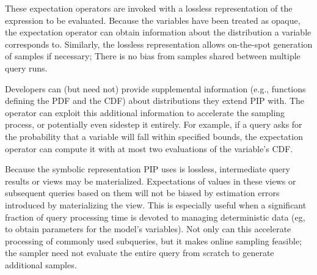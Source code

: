 These expectation operators are invoked with a lossless representation of the expression to be evaluated.  Because the variables have been treated as opaque, the expectation operator can obtain information about the distribution a variable corresponds to.  Similarly, the lossless representation allows on-the-spot generation of samples if necessary; There is no bias from samples shared between multiple query runs.

Developers can (but need not) provide supplemental information (e.g., functions defining the PDF and the CDF) about distributions they extend PIP with.  The operator can exploit this additional information to accelerate the sampling process, or potentially even sidestep it entirely.  For example, if a query asks for the probability that a variable will fall within specified bounds, the expectation operator can compute it with at most two evaluations of the variable's CDF.

Because the symbolic representation PIP uses is lossless, intermediate query results or views may be materialized.  Expectations of values in these views or subsequent queries based on them will not be biased by estimation errors introduced by materializing the view.  This is especially useful when a significant fraction of query processing time is devoted to managing deterministic data (eg, to obtain parameters for the model's variables).  Not only can this accelerate processing of commonly used subqueries, but it makes online sampling feasible; the sampler need not evaluate the entire query from scratch to generate additional samples.

